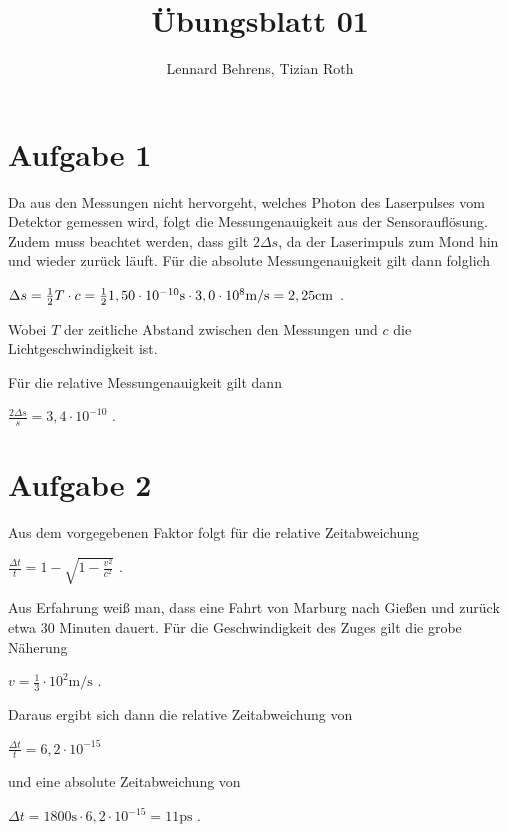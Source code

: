 \documentclass[a4paper,11pt]{article}
\title{Übungsblatt 01}
\author{Lennard Behrens, Tizian Roth}
\begin{document}
\maketitle

\section{Aufgabe 1}

Da aus den Messungen nicht hervorgeht, welches Photon des Laserpulses vom Detektor gemessen wird, folgt die Messungenauigkeit aus der Sensorauflösung. Zudem muss beachtet werden, dass gilt $2\Delta s$, da der Laserimpuls zum Mond hin und wieder zurück läuft.
Für die absolute Messungenauigkeit gilt dann folglich \\
\begin{center}
  $\Delta s = \frac{1}{2} T \cdot c = \frac{1}{2} 1,50 \cdot 10^{-10} \mbox s \cdot 3,0 \cdot 10^{8} \mbox{m/s} = 2,25 \mbox{cm}$ .
\end{center}
Wobei $T$ der zeitliche Abstand zwischen den Messungen und $c$ die Lichtgeschwindigkeit ist. \par
Für die relative Messungenauigkeit gilt dann
\begin{center}
  $\frac{2\Delta s}{s} = 3,4 \cdot 10^{-10} $ .
\end{center}


\section{Aufgabe 2}

Aus dem vorgegebenen Faktor folgt für die relative Zeitabweichung
\begin{center}
  $\frac{\Delta t}{t} = 1 - \sqrt{1 - \frac{v^2}{c^2}}$ .
\end{center}
Aus Erfahrung weiß man, dass eine Fahrt von Marburg nach Gießen und zurück etwa $30$ Minuten dauert. 
Für die Geschwindigkeit des Zuges gilt die grobe Näherung
\begin{center}
  $v = \frac 1 3 \cdot 10^2 \mbox{m/s}$ .
\end{center}
Daraus ergibt sich dann die relative Zeitabweichung von
\begin{center}
  $\frac{\Delta t}{t} = 6,2 \cdot 10^{-15} $
\end{center}
und eine absolute Zeitabweichung von
\begin{center}
  $\Delta t = 1800 \mbox{s} \cdot 6,2 \cdot 10^{-15} = 11 \mbox{ps}$ .  
\end{center}
\end{document}
